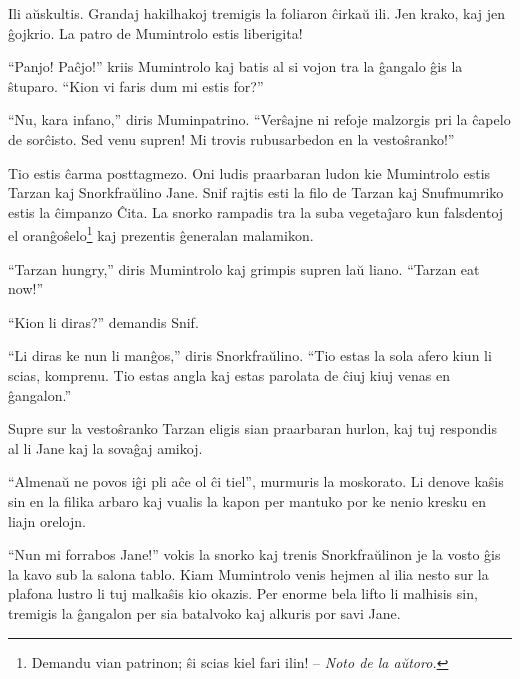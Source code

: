 Ili aŭskultis. Grandaj hakilhakoj tremigis la foliaron ĉirkaŭ ili. Jen krako, kaj jen ĝojkrio. La patro de Mumintrolo estis liberigita!

``Panjo! Paĉjo!'' kriis Mumintrolo kaj batis al si vojon tra la ĝangalo ĝis la ŝtuparo. ``Kion vi faris dum mi estis for?''

``Nu, kara infano,'' diris Muminpatrino. ``Verŝajne ni refoje malzorgis pri la ĉapelo de sorĉisto. Sed venu supren! Mi trovis rubusarbedon en la vestoŝranko!''

Tio estis ĉarma posttagmezo. Oni ludis praarbaran ludon kie Mumintrolo estis Tarzan kaj Snorkfraŭlino Jane. Snif rajtis esti la filo de Tarzan kaj Snufmumriko estis la ĉimpanzo Ĉita. La snorko rampadis tra la suba vegetaĵaro kun falsdentoj el oranĝoŝelo\footnote{Demandu vian patrinon; ŝi scias kiel fari ilin! -- \emph{Noto de la aŭtoro.}} kaj prezentis ĝeneralan malamikon.

``Tarzan hungry,'' diris Mumintrolo kaj grimpis supren laŭ liano. ``Tarzan eat now!''

``Kion li diras?'' demandis Snif.

``Li diras ke nun li manĝos,'' diris Snorkfraŭlino. ``Tio estas la sola afero kiun li scias, komprenu. Tio estas angla kaj estas parolata de ĉiuj kiuj venas en ĝangalon.''

Supre sur la vestoŝranko Tarzan eligis sian praarbaran hurlon, kaj tuj respondis al li Jane kaj la sovaĝaj amikoj.

``Almenaŭ ne povos iĝi pli aĉe ol ĉi tiel'', murmuris la moskorato. Li denove kaŝis sin en la filika arbaro kaj vualis la kapon per mantuko por ke nenio kresku en liajn orelojn.

``Nun mi forrabos Jane!'' vokis la snorko kaj trenis Snorkfraŭlinon je la vosto ĝis la kavo sub la salona tablo. Kiam Mumintrolo venis hejmen al ilia nesto sur la plafona lustro li tuj malkaŝis kio okazis. Per enorme bela lifto li malhisis sin, tremigis la ĝangalon per sia batalvoko kaj alkuris por savi Jane.

